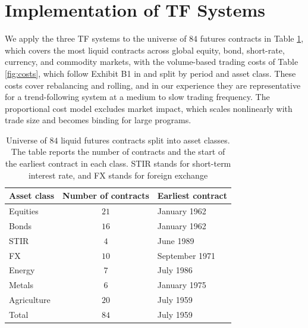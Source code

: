 \documentclass[hidelinks]{siamonline250211}
\begin{document}
\section{Implementation of TF Systems}\label{sc:impl}

We apply the three TF systems to the universe of $84$ futures contracts in Table \ref{fig:universe}, which covers the most liquid contracts across global equity, bond, short-rate, currency, and commodity markets, with the volume-based trading costs of Table \ref{fig:costs}, which follow Exhibit B1 in \citet{Hurst2017} and split by period and asset class. These costs cover rebalancing and rolling, and in our experience they are representative for a trend-following system at a medium to slow trading frequency. The proportional cost model excludes market impact, which scales nonlinearly with trade size and becomes binding for large programs.

\begin{table}[th]
	\small
	\centering
	\begin{tabular}{lcl}
		\hline
		Asset class & Number of contracts & Earliest contract \\
		\hline
		Equities & $21$ & January 1962 \\
		Bonds & $16$ & January 1962 \\
		STIR & $4$ & June 1989 \\
		FX & $10$ & September 1971 \\
		Energy & $7$ & July 1986 \\
		Metals & $6$ & January 1975 \\
		Agriculture & $20$ & July 1959 \\
		\hline
		Total & $84$ & July 1959 \\
		\hline
	\end{tabular}
	\caption{Universe of $84$ liquid futures contracts split into asset classes. The table reports the number of contracts and the start of the earliest contract in each class. STIR stands for short-term interest rate, and FX stands for foreign exchange}
	\label{fig:universe}
\end{table}
\end{document}
